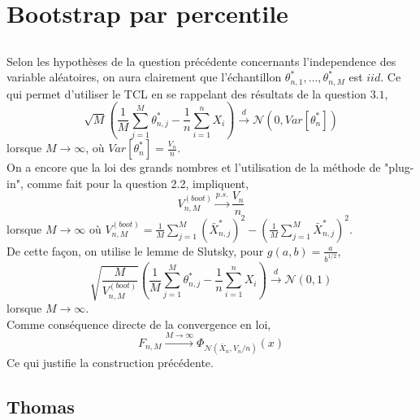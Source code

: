 \documentclass{article}
\begin{document}
\section{Bootstrap par percentile}
\subsection{}
Selon les hypothèses de la question précédente concernants l'independence des variable aléatoires, on aura clairement que l'échantillon $\displaystyle \theta^{*}_{n,1}, \hdots, \theta^{*}_{n,M}$  est $\displaystyle iid$. Ce qui permet d'utiliser le TCL en se rappelant des résultats de la question $\displaystyle 3.1$,
$$\sqrt{M}\left(\frac{1}{M}\sum_{j=1}^{M}\theta^{*}_{n,j}-\frac{1}{n}\sum_{i=1}^{n}X_i\right)\overset{d}{\longrightarrow}\mathcal{N}(0,Var[\theta^{*}_{n}])$$
lorsque $\displaystyle M\to \infty$, où $\displaystyle Var[\theta^{*}_{n}]=\frac{V_n}{n}$.\\
On a encore que la loi des grands nombres et l'utilisation de la méthode de "plug-in", comme fait pour la question 2.2, impliquent, 
$$V^{(boot)}_{n,M}\overset{p.s.}{\longrightarrow}\frac{V_{n}}{n}$$
lorsque $\displaystyle M\to\infty$ où $\displaystyle V^{(boot)}_{n,M}=\frac{1}{M}\sum_{j=1}^{M}(\bar X^{*}_{n,j})^2-\left(\frac{1}{M}\sum_{j=1}^{M}\bar X^{*}_{n,j}\right)^2$. \\
De cette façon, on utilise le lemme de Slutsky, pour $\displaystyle g(a,b)=\frac{a}{b^{1/2}}$,
$$\sqrt{\frac{M}{ V^{(boot)}_{n,M}}}\left(\frac{1}{M}\sum_{j=1}^{M}\theta^{*}_{n,j}-\frac{1}{n}\sum_{i=1}^{n}X_i\right)\overset{d}{\longrightarrow}\mathcal{N}(0,1)$$
lorsque $\displaystyle M\to\infty$. \\
Comme conséquence directe de la convergence en loi,
$$F_{n,M}\overset{M\to\infty}{\longrightarrow}\Phi_{\mathcal{N}(\bar X_n, V_n/n)}(x)$$
Ce qui justifie la construction précédente.
\subsection{Thomas}
\end{document}
